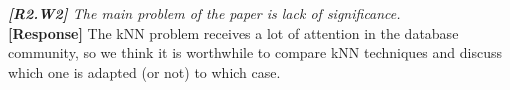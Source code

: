 \documentclass[11pt]{letter}
\newcommand{\svs}{\vspace{0.36ex}}
\newcommand{\TODO}[1]{\textcolor{red}{\textbf{[TODO:#1]}}}
\newcommand{\TODOREP}[1]{\textcolor{green}{\textbf{[TODO:#1]}}}
\begin{document}

%

%
%

\svs
\noindent
{\em
{\bf [R2.W2]}
The main problem of the paper is lack of significance.}\\
\textbf{[Response]} The kNN problem receives a lot of attention in the database community, so we think it is worthwhile 
to compare kNN techniques and discuss which one is adapted (or not) to which case. 
\end{document}

